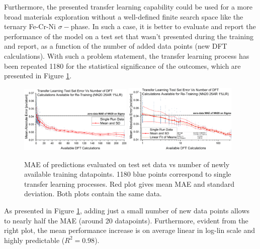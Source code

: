 Furthermore, the presented transfer learning capability could be used for a more broad materials exploration without a well-defined finite search space like the ternary Fe-Cr-Ni $\sigma-$phase. In such a case, it is better to evaluate and report the performance of the model on a test set that wasn't presented during the training and report, as a function of the number of added data points (new DFT calculations). With such a problem statement, the transfer learning process has been repeated 1180 for the statistical significance of the outcomes, which are presented in Figure \ref{sipfenn:fig:transfersigmaVsDatapoints}.

\begin{figure}[H]
    \centering
    \includegraphics[width=0.48\textwidth]{sipfenn/transferLearning_vs_datapoints.png}
    \includegraphics[width=0.48\textwidth]{sipfenn/transferLearning_vs_datapoints_LinLog.png}
    \caption{MAE of predictions evaluated on test set data vs number of newly available training datapoints. 1180 blue points correspond to single transfer learning processes. Red plot gives mean MAE and standard deviation. Both plots contain the same data.}
    \label{sipfenn:fig:transfersigmaVsDatapoints}
    \vspace{-12pt}
\end{figure}

As presented in Figure \ref{sipfenn:fig:transfersigmaVsDatapoints}, adding just a small number of new data points allows to nearly half the MAE (around 20 datapoints). Furthermore, evident from the right plot, the mean performance increase is on average linear in log-lin scale and highly predictable ($R^2=0.98$).


